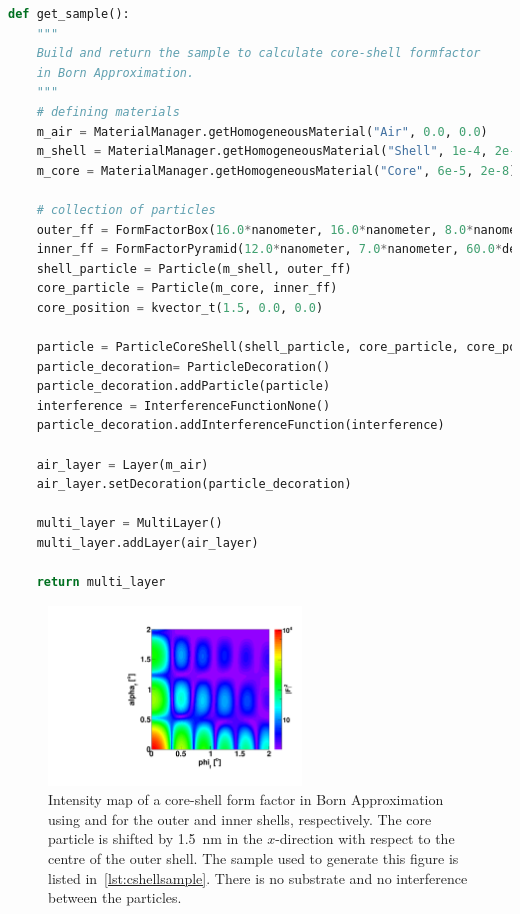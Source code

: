 \begin{lstlisting}[language=python,
  style=eclipseboxed,numbers=none,nolol,caption={\Code{Python} script
    to create a core-shell particle made of a box with a pyramidal shifted inset.},label={lst:cshellsample}]
def get_sample():
    """
    Build and return the sample to calculate core-shell formfactor 
    in Born Approximation.
    """
    # defining materials 
    m_air = MaterialManager.getHomogeneousMaterial("Air", 0.0, 0.0)
    m_shell = MaterialManager.getHomogeneousMaterial("Shell", 1e-4, 2e-8)
    m_core = MaterialManager.getHomogeneousMaterial("Core", 6e-5, 2e-8)

    # collection of particles
    outer_ff = FormFactorBox(16.0*nanometer, 16.0*nanometer, 8.0*nanometer) 
    inner_ff = FormFactorPyramid(12.0*nanometer, 7.0*nanometer, 60.0*degree)
    shell_particle = Particle(m_shell, outer_ff)
    core_particle = Particle(m_core, inner_ff)
    core_position = kvector_t(1.5, 0.0, 0.0)

    particle = ParticleCoreShell(shell_particle, core_particle, core_position)
    particle_decoration= ParticleDecoration()
    particle_decoration.addParticle(particle)
    interference = InterferenceFunctionNone()
    particle_decoration.addInterferenceFunction(interference)

    air_layer = Layer(m_air)
    air_layer.setDecoration(particle_decoration)

    multi_layer = MultiLayer()
    multi_layer.addLayer(air_layer)

    return multi_layer
\end{lstlisting}

\begin{figure}[h]
\begin{center}
\includegraphics[width=0.6\textwidth]{Figures/CoreShellParallPyr}
\end{center}
\caption{Intensity map of a core-shell form factor in Born Approximation using   and  for the outer and inner shells, respectively. The core particle is shifted by 1.5~nm in the $x$-direction with respect to the centre of the outer shell. The sample used to generate this figure is listed in~\ref{lst:cshellsample}.  There is no substrate and no interference between the particles.}
\label{fig:FFCoreShellBA}
\end{figure}

